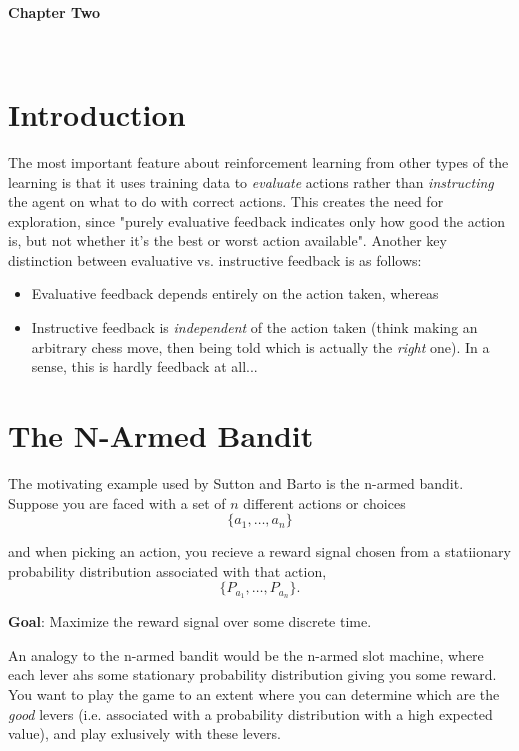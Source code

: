 \documentclass[11pt]{article}
\theoremstyle{definition}
\begin{document}
~
~

\begin{center}
  {
	\fontsize{1.5cm}{1.5cm}
        \textcolor{CalPolyGreen}{\textbf{Chapter Two}}
  }

\end{center}

~
~

\section*{\textcolor{CalPolyGreen}{Introduction}}

The most important feature about reinforcement learning from other types of the learning is that it uses training data to \textit{evaluate} actions rather than \textit{instructing} the agent on what to do with correct actions. This creates the need for exploration, since "purely evaluative feedback indicates only how good the action is, but not whether it's the best or worst action available". Another key distinction between evaluative vs. instructive feedback is as follows:

\begin{itemize}
    \item Evaluative feedback depends entirely on the action taken, whereas
    \item Instructive feedback is \textit{independent} of the action taken (think making an arbitrary chess move, then being told which is actually the \textit{right} one).  In a sense, this is hardly feedback at all...
\end{itemize}

\section*{\textcolor{CalPolyGreen}{The N-Armed Bandit}}

The motivating example used by Sutton and Barto is the n-armed bandit.  Suppose you are faced with a set of $n$ different actions or choices
\[
    \{a_1, \dots, a_n\}
\]

and when picking an action, you recieve a reward signal chosen from a statiionary probability distribution associated with that action,
\[
    \big\{P_{a_1}, \dots, P_{a_n}\big\}.
\]

\textbf{Goal}: Maximize the reward signal over some discrete time.

An analogy to the n-armed bandit would be the n-armed slot machine, where each lever ahs some stationary probability distribution giving you some reward.  You want to play the game to an extent where you can determine which are the \textit{good} levers (i.e. associated with a probability distribution with a high expected value), and play exlusively with these levers.
\end{document}
